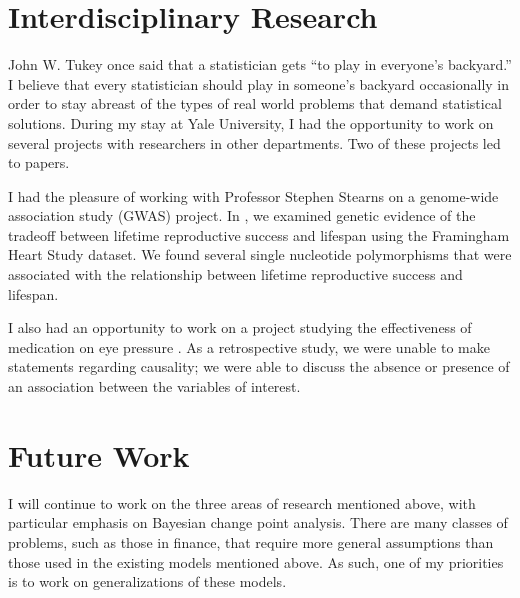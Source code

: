 \documentclass[11pt]{article}
\begin{document}
\section{Interdisciplinary Research} %
\label{sec:interdisciplinary_research}
  John W. Tukey once said that a statistician gets ``to play in everyone's backyard.'' I believe that every statistician should play in someone's backyard occasionally in order to stay abreast of the types of real world problems that demand statistical solutions. During my stay at Yale University, I had the opportunity to work on several projects with researchers in other departments. Two of these projects led to papers.

  I had the pleasure of working with Professor Stephen Stearns on a genome-wide association study (GWAS) project. In \cite{wang2013genetic}, we examined genetic evidence of the tradeoff between lifetime reproductive success and lifespan using the Framingham Heart Study dataset. We found several single nucleotide polymorphisms that were associated with the relationship between lifetime reproductive success and lifespan.

  I also had an opportunity to work on a project studying the effectiveness of medication on eye pressure \cite{intraoc}. As a retrospective study, we were unable to make statements regarding causality; we were able to discuss the absence or presence of an association between the variables of interest.

\section{Future Work} %
\label{sec:future_work}
  I will continue to work on the three areas of research mentioned above, with particular emphasis on Bayesian change point analysis. There are many classes of problems, such as those in finance, that require more general assumptions than those used in the existing models mentioned above. As such, one of my priorities is to work on generalizations of these models.
 

\end{document}
